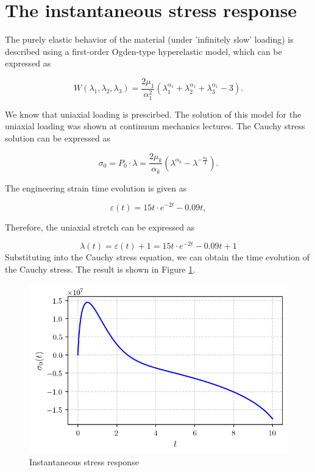 \documentclass[12pt,a4paper]{article}
\begin{document}
\section{The instantaneous stress response}

The purely elastic behavior of the material (under 'infinitely slow' loading) is described using a first-order Ogden-type hyperelastic model, which can be expressed as 

\begin{equation}
    W(\lambda_1, \lambda_2, \lambda_3) = \frac{2\mu_1}{\alpha_1^2} \left( \lambda_1^{\alpha_1} + \lambda_2^{\alpha_1} + \lambda_3^{\alpha_1} - 3 \right).
\end{equation}

We know that uniaxial loading is prescirbed. The solution of this model for the uniaxial loading was shown at continuum mechanics lectures. The Cauchy stress solution can be expressed as

\begin{equation}
\sigma_0 = P_0\cdot\lambda = \frac{2\mu_k}{\alpha_k}(\lambda^{\alpha_k} - \lambda^{-\frac{\alpha_k}{2}}).
\end{equation}

The engineering strain time evolution is given as

\begin{equation}
\varepsilon(t) = 15t\cdot e^{-2t}-0.09t,
\end{equation}

Therefore, the uniaxial stretch can be expressed as

$$
\lambda(t) = \varepsilon(t) + 1 = 15t\cdot e^{-2t}-0.09t + 1
$$
Substituting into the Cauchy stress equation, we can obtain the time evolution of the Cauchy stress. The result is shown in Figure \ref{fig:instantaneous_stress}.
\begin{figure}[H]
    \centering
    \includegraphics[scale=0.8]{figures/elastic_solution.png}
    \caption{Instantaneous stress response}
 \label{fig:instantaneous_stress}
\end{figure}
\end{document}
